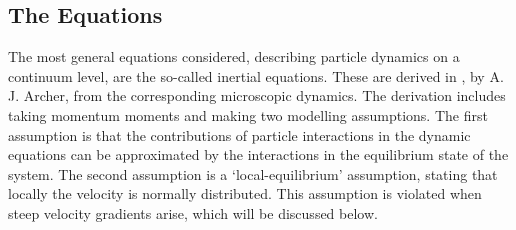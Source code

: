 \documentclass[11pt, a4paper]{article}
\theoremstyle{definition}
\begin{document}
\subsection{The Equations}
The most general equations considered, describing particle dynamics on a continuum level, are the so-called inertial equations. These are derived in \cite{Archer1}, by A. J. Archer, from the corresponding microscopic dynamics. The derivation includes taking momentum moments and making two modelling assumptions. The first assumption is that the contributions of particle interactions in the dynamic equations can be approximated by the interactions in the equilibrium state of the system. The second assumption is a `local-equilibrium' assumption, stating that locally the velocity is normally distributed. This assumption is violated when steep velocity gradients arise, which will be discussed below.
\end{document}
